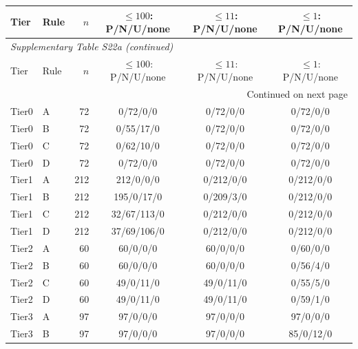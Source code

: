 \begin{longtable}{llrccc}

\toprule Tier & Rule & $n$ & $\leq100$: P/N/U/none & $\leq11$: P/N/U/none & $\leq1$: P/N/U/none \\ \midrule\endfirsthead

\multicolumn{6}{l}{\textit{Supplementary Table S22a (continued)}} \\

\toprule Tier & Rule & $n$ & $\leq100$: P/N/U/none & $\leq11$: P/N/U/none & $\leq1$: P/N/U/none \\ \midrule\endhead

\midrule\multicolumn{6}{r}{Continued on next page}\\\endfoot\bottomrule\endlastfoot

Tier0 & A & 72 & 0/72/0/0 & 0/72/0/0 & 0/72/0/0 \\

Tier0 & B & 72 & 0/55/17/0 & 0/72/0/0 & 0/72/0/0 \\

Tier0 & C & 72 & 0/62/10/0 & 0/72/0/0 & 0/72/0/0 \\

Tier0 & D & 72 & 0/72/0/0 & 0/72/0/0 & 0/72/0/0 \\

Tier1 & A & 212 & 212/0/0/0 & 0/212/0/0 & 0/212/0/0 \\

Tier1 & B & 212 & 195/0/17/0 & 0/209/3/0 & 0/212/0/0 \\

Tier1 & C & 212 & 32/67/113/0 & 0/212/0/0 & 0/212/0/0 \\

Tier1 & D & 212 & 37/69/106/0 & 0/212/0/0 & 0/212/0/0 \\

Tier2 & A & 60 & 60/0/0/0 & 60/0/0/0 & 0/60/0/0 \\

Tier2 & B & 60 & 60/0/0/0 & 60/0/0/0 & 0/56/4/0 \\

Tier2 & C & 60 & 49/0/11/0 & 49/0/11/0 & 0/55/5/0 \\

Tier2 & D & 60 & 49/0/11/0 & 49/0/11/0 & 0/59/1/0 \\

Tier3 & A & 97 & 97/0/0/0 & 97/0/0/0 & 97/0/0/0 \\

Tier3 & B & 97 & 97/0/0/0 & 97/0/0/0 & 85/0/12/0 \\


\end{longtable}
